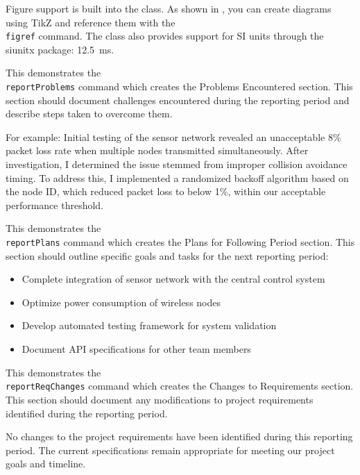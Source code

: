 \documentclass[titlecase]{capstone_report}
\begin{document}
Figure support is built into the class. As shown in \figref{\ref{fig:example}}, you can create diagrams using TikZ and reference them with the \texttt{\\figref} command. The class also provides support for SI units through the siunitx package: \SI{12.5}{\milli\second}.

\reportProblems
This demonstrates the \texttt{\\reportProblems} command which creates the Problems Encountered section. This section should document challenges encountered during the reporting period and describe steps taken to overcome them.

For example: Initial testing of the sensor network revealed an unacceptable 8\% packet loss rate when multiple nodes transmitted simultaneously. After investigation, I determined the issue stemmed from improper collision avoidance timing. To address this, I implemented a randomized backoff algorithm based on the node ID, which reduced packet loss to below 1\%, within our acceptable performance threshold.

\reportPlans
This demonstrates the \texttt{\\reportPlans} command which creates the Plans for Following Period section. This section should outline specific goals and tasks for the next reporting period:

\begin{itemize}
    \item Complete integration of sensor network with the central control system
    \item Optimize power consumption of wireless nodes
    \item Develop automated testing framework for system validation
    \item Document API specifications for other team members
\end{itemize}

\reportReqChanges
This demonstrates the \texttt{\\reportReqChanges} command which creates the Changes to Requirements section. This section should document any modifications to project requirements identified during the reporting period.

No changes to the project requirements have been identified during this reporting period. The current specifications remain appropriate for meeting our project goals and timeline.
\end{document}
